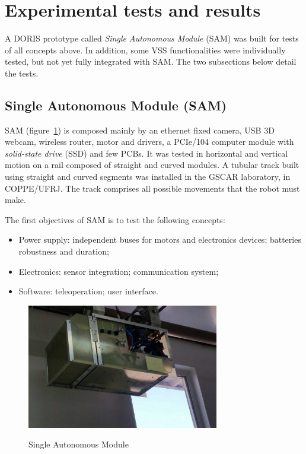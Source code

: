 \documentclass{ifacconf}
\begin{document}
\section{Experimental tests and results}\label{sec:results}
A DORIS prototype called \emph{Single Autonomous Module} (SAM) was built for tests of all concepts above. In addition, some VSS functionalities were individually tested, but not yet fully integrated with SAM. The two subsections below detail the tests.

\subsection{Single Autonomous Module (SAM)}
SAM (figure~\ref{fig:SAM2}) is composed mainly by an ethernet fixed camera, USB 3D webcam, wireless router, motor and drivers, a PCIe/104 computer module with \emph{solid-state drive} (SSD) and few PCBs. It was tested in horizontal and vertical motion on a rail composed of straight and curved modules. A tubular track built using straight and curved segments was installed in the GSCAR laboratory, in COPPE/UFRJ. The track comprises all possible movements that the robot must make.

The first objectives of SAM is to test the following concepts:
\begin{itemize}
  \item Power supply: independent buses for motors and electronics devices;
  batteries robustness and duration;
  \item Electronics: sensor integration; communication system;
  \item Software: teleoperation; user interface.
  \end{itemize}

\begin{figure}[!h]
\begin{center}
\includegraphics[width=8.4cm]{figs/SAM2.jpg}  %
\label{fig:SAM2}
\caption{Single Autonomous Module}
\end{center}
\end{figure}
\end{document}
